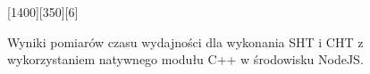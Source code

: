 

\begin{figure}[ht]
     {

        \seqReferenceLookup
    }{

        \seqReferenceCircle
    }[1400][350][6]

    \caption{Wyniki pomiarów czasu wydajności dla wykonania SHT i CHT z wykorzystaniem natywnego modułu C++ w środowisku NodeJS.}
    \label{plot:cpu-addon}
\end{figure}
